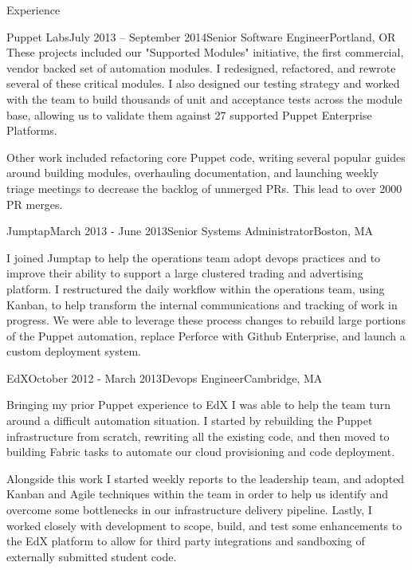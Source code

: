 \documentclass{resume} %
\begin{document}
\begin{rSection}{Experience}
\begin{rSubsection}{Puppet Labs}{July 2013 -- September 2014}{Senior Software Engineer}{Portland, OR}
These projects included our "Supported Modules" initiative, the first commercial, vendor backed set of  automation modules.  I redesigned, refactored, and rewrote several of these critical modules.  I also designed our testing strategy and worked with the team to build thousands of unit and acceptance tests across the module base, allowing us to validate them against 27 supported Puppet Enterprise Platforms.

Other work included refactoring core Puppet code, writing several popular guides around building modules, overhauling documentation, and launching weekly triage meetings to decrease the backlog of unmerged PRs.  This lead to over 2000 PR merges.
\end{rSubsection}


\begin{rSubsection}{Jumptap}{March 2013 - June 2013}{Senior Systems Administrator}{Boston, MA}
\item[] I joined Jumptap to help the operations team adopt devops practices and to improve their ability to support a large clustered trading and advertising platform.  I restructured the daily workflow within the operations team, using Kanban, to help transform the internal communications and tracking of work in progress.  We were able to leverage these process changes to rebuild large portions of the Puppet automation, replace Perforce with Github Enterprise, and launch a custom deployment system.

\end{rSubsection}


\begin{rSubsection}{EdX}{October 2012 - March 2013}{Devops Engineer}{Cambridge, MA}
\item[] Bringing my prior Puppet experience to EdX I was able to help the team turn around a difficult automation situation.  I started by rebuilding the Puppet infrastructure from scratch, rewriting all the existing code, and then moved to building Fabric tasks to automate our cloud provisioning and code deployment.

Alongside this work I started weekly reports to the leadership team, and adopted  Kanban and Agile techniques within the team in order to help us identify and overcome some bottlenecks in our infrastructure delivery pipeline.  Lastly, I worked closely with development to scope, build, and test some enhancements to the EdX platform to allow for third party integrations and sandboxing of externally submitted student code.
\end{rSubsection}


\end{rSection}
\end{document}
